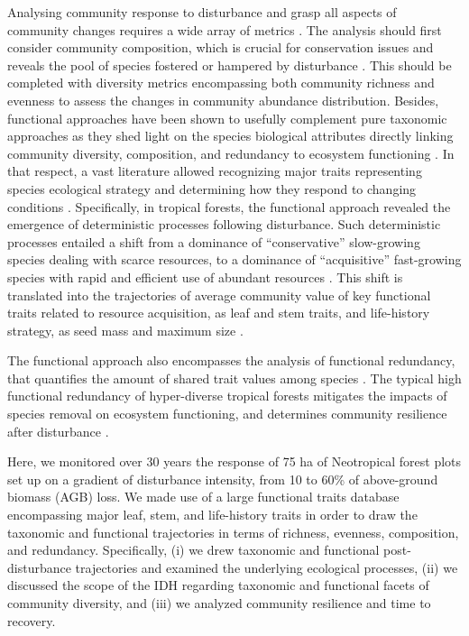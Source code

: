 \documentclass[fleqn,10pt]{ArtEcoFoG} %
\theoremstyle{definition}
\theoremstyle{definition}
\theoremstyle{definition}
\theoremstyle{remark}
\begin{document}
Analysing community response to disturbance and grasp all aspects of
community changes requires a wide array of metrics
\citep{Sheil2003, Shea2004, Mayfield2010}. The analysis should first
consider community composition, which is crucial for conservation issues
and reveals the pool of species fostered or hampered by disturbance
\citep{Lavorel2002, Bellwood2006}. This should be completed with
diversity metrics encompassing both community richness and evenness to
assess the changes in community abundance distribution. Besides,
functional approaches have been shown to usefully complement pure
taxonomic approaches as they shed light on the species biological
attributes directly linking community diversity, composition, and
redundancy to ecosystem functioning \citep{Violle2007b, Baraloto2012a}.
In that respect, a vast literature allowed recognizing major traits
representing species ecological strategy and determining how they
respond to changing conditions \citep{Diaz2005}. Specifically, in
tropical forests, the functional approach revealed the emergence of
deterministic processes following disturbance. Such deterministic
processes entailed a shift from a dominance of ``conservative''
slow-growing species dealing with scarce resources, to a dominance of
``acquisitive'' fast-growing species with rapid and efficient use of
abundant resources \citep{Rees2001, Reich2014, Herault2011}. This shift
is translated into the trajectories of average community value of key
functional traits related to resource acquisition, as leaf and stem
traits, and life-history strategy, as seed mass and maximum size
\citep{Wright2004, TerSteege2006, Westoby2006a, Chave2009b}.

The functional approach also encompasses the analysis of functional
redundancy, that quantifies the amount of shared trait values among
species \citep{Carmona2016}. The typical high functional redundancy of
hyper-diverse tropical forests \citep{Bellwood2006} mitigates the
impacts of species removal on ecosystem functioning, and determines
community resilience after disturbance \citep{Elmqvist2003, Diaz2005}.

Here, we monitored over 30 years the response of 75 ha of Neotropical
forest plots set up on a gradient of disturbance intensity, from 10 to
60\% of above-ground biomass (AGB) loss. We made use of a large
functional traits database encompassing major leaf, stem, and
life-history traits in order to draw the taxonomic and functional
trajectories in terms of richness, evenness, composition, and
redundancy. Specifically, (i) we drew taxonomic and functional
post-disturbance trajectories and examined the underlying ecological
processes, (ii) we discussed the scope of the IDH regarding taxonomic
and functional facets of community diversity, and (iii) we analyzed
community resilience and time to recovery.
\end{document}
